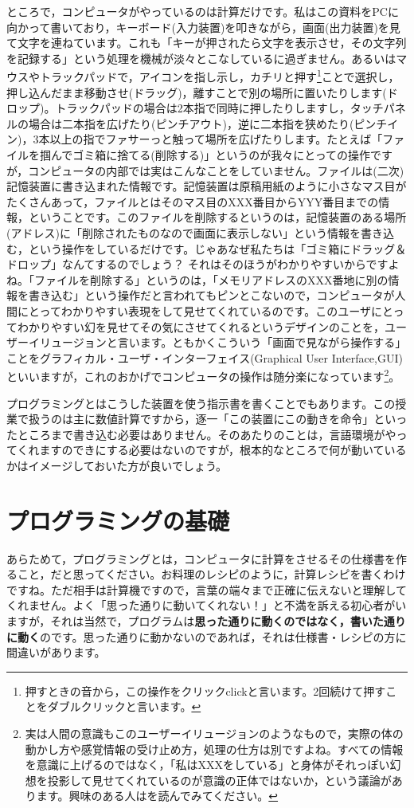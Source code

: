 \documentclass{ltjsbook}
\begin{document}
ところで，コンピュータがやっているのは計算だけです。私はこの資料をPCに向かって書いており，キーボード(入力装置)を叩きながら，画面(出力装置)を見て文字を連ねています。これも「キーが押されたら文字を表示させ，その文字列を記録する」という処理を機械が淡々とこなしているに過ぎません。あるいはマウスやトラックパッドで，アイコンを指し示し，カチリと押す\footnote{押すときの音から，この操作をクリックclickと言います。2回続けて押すことをダブルクリックと言います。}ことで選択し，押し込んだまま移動させ(ドラッグ)，離すことで別の場所に置いたりします(ドロップ)。トラックパッドの場合は2本指で同時に押したりしますし，タッチパネルの場合は二本指を広げたり(ピンチアウト)，逆に二本指を狭めたり(ピンチイン)，3本以上の指でファサーっと触って場所を広げたりします。たとえば「ファイルを掴んでゴミ箱に捨てる(削除する)」というのが我々にとっての操作ですが，コンピュータの内部では実はこんなことをしていません。ファイルは(二次)記憶装置に書き込まれた情報です。記憶装置は原稿用紙のように小さなマス目がたくさんあって，ファイルとはそのマス目のXXX番目からYYY番目までの情報，ということです。このファイルを削除するというのは，記憶装置のある場所(アドレス)に「削除されたものなので画面に表示しない」という情報を書き込む，という操作をしているだけです。じゃあなぜ私たちは「ゴミ箱にドラッグ＆ドロップ」なんてするのでしょう？ それはそのほうがわかりやすいからですよね。「ファイルを削除する」というのは，「メモリアドレスのXXX番地に別の情報を書き込む」という操作だと言われてもピンとこないので，コンピュータが人間にとってわかりやすい表現をして見せてくれているのです。このユーザにとってわかりやすい幻を見せてその気にさせてくれるというデザインのことを，ユーザーイリュージョンと言います。ともかくこういう「画面で見ながら操作する」ことをグラフィカル・ユーザ・インターフェイス(Graphical User Interface,GUI)といいますが，これのおかげでコンピュータの操作は随分楽になっています\footnote{実は人間の意識もこのユーザーイリュージョンのようなもので，実際の体の動かし方や感覚情報の受け止め方，処理の仕方は別ですよね。すべての情報を意識に上げるのではなく，「私はXXXをしている」と身体がそれっぽい幻想を投影して見せてくれているのが意識の正体ではないか，という議論があります。興味のある人は\textcite{UserIlluision2002}を読んでみてください。}。

プログラミングとはこうした装置を使う指示書を書くことでもあります。この授業で扱うのは主に数値計算ですから，逐一「この装置にこの動きを命令」といったところまで書き込む必要はありません。そのあたりのことは，言語環境がやってくれますのできにする必要はないのですが，根本的なところで何が動いているかはイメージしておいた方が良いでしょう。


\section{プログラミングの基礎}
あらためて，プログラミングとは，コンピュータに計算をさせるその仕様書を作ること，だと思ってください。お料理のレシピのように，計算レシピを書くわけですね。ただ相手は計算機ですので，言葉の端々まで正確に伝えないと理解してくれません。よく「思った通りに動いてくれない！」と不満を訴える初心者がいますが，それは当然で，プログラムは\textbf{思った通りに動くのではなく，書いた通りに動く}のです。思った通りに動かないのであれば，それは仕様書・レシピの方に間違いがあります。
\end{document}

